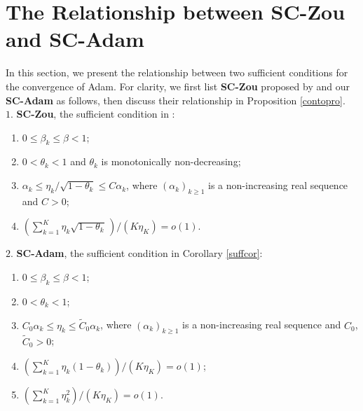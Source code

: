 \documentclass[twoside,11pt]{article}
\begin{document}
\section{The Relationship between \textbf{SC-Zou} and \textbf{SC-Adam}}\label{B}
In this section, we present the relationship between two sufficient conditions for the convergence of Adam. For clarity, we first list \textbf{SC-Zou} proposed by \citet{zou2019sufficient} and our \textbf{SC-Adam} as follows, then discuss their relationship in Proposition \ref{contopro}.\\[1.5mm]
$1.$ \textbf{SC-Zou}, the sufficient condition in \citet{zou2019sufficient}:
\begin{enumerate}
\item[\textcircled{\scriptsize z1}] $0\le\beta_k\le\beta<1$;
\item[\textcircled{\scriptsize z2}]$0<\theta_k<1$ and $\theta_k$ is monotonically non-decreasing;
\item[\textcircled{\scriptsize z3}] $ \alpha_k\le\eta_k/\sqrt{1-\theta_k}\le C\alpha_k$, where $(\alpha_k)_{k\ge 1}$ is a non-increasing real sequence  and $C>0$;
\item[\textcircled{\scriptsize z4}] $\left( \sum_{k=1}^{K}\eta_k\sqrt{1-\theta_k}\,
\right)\big/\left( K\eta_{K}\right) =o(1)$. 
\end{enumerate}
$2.$ \textbf{SC-Adam}, the sufficient condition in Corollary \ref{suffcor}:
\begin{enumerate}
\item[\textcircled{\small{1}}] $0\le\beta_k\le\beta<1$;
\item[\textcircled{\small{2}}] $0<\theta_k<1$; 
\item[\textcircled{\small{3}}] $C_0\alpha_k\le \eta_{k}\le \tilde{C}_0 \alpha_k$, where $(\alpha_k)_{k\ge 1}$ is a non-increasing real sequence and $C_0$, $\tilde{C}_0>0$;  
\item[\textcircled{\small{4}}] $\left( \sum_{k=1}^{K}\eta_k{(1-\theta_k)}\right) \big/\left( K\eta_{K}\right) =o(1)$;
\item[\textcircled{\small{5}}] $\left( \sum_{k=1}^{K}\eta_k^2\right) \big/\left( K\eta_{K}\right) =o(1)$. 
\end{enumerate}
\end{document}
